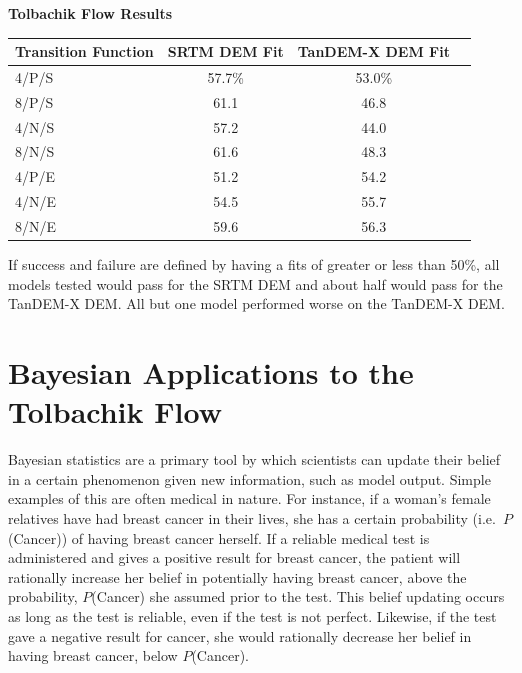 \documentclass[12pt,letter]{article}
\begin{document}
		\newpage
		\begin{center}
			\textbf{Tolbachik Flow Results}\\
			\begin{tabular}{l c c c}
				\toprule
				Transition Function&SRTM DEM Fit&TanDEM-X DEM Fit\\
				\midrule
				4/P/S & 57.7\%& 53.0\%\\
				8/P/S & 61.1  & 46.8\\
				4/N/S & 57.2  & 44.0\\
				8/N/S & 61.6  & 48.3\\
				4/P/E & 51.2  & 54.2\\
				4/N/E & 54.5  & 55.7\\
				8/N/E & 59.6  & 56.3\\
				
				\bottomrule
			\end{tabular}
		\end{center}

		If success and failure are defined by having a fits of greater or less than 50\%, all models tested would pass for the SRTM DEM and about half would pass for the TanDEM-X DEM. All but one model performed worse on the TanDEM-X DEM.


\section{Bayesian Applications to the Tolbachik Flow}\label{sec:Bayesian}
	Bayesian statistics are a primary tool by which scientists can update their belief in a certain phenomenon given new information, such as model output. Simple examples of this are often medical in nature. For instance, if a woman's female relatives have had breast cancer in their lives, she has a certain probability (i.e.~$P$(Cancer)) of having breast cancer herself. If a reliable medical test is administered and gives a positive result for breast cancer, the patient will rationally increase her belief in potentially having breast cancer, above the probability, $P$(Cancer) she assumed prior to the test. This belief updating occurs as long as the test is reliable, even if the test is not perfect. Likewise, if the test gave a negative result for cancer, she would rationally decrease her belief in having breast cancer, below $P$(Cancer).
\end{document}
